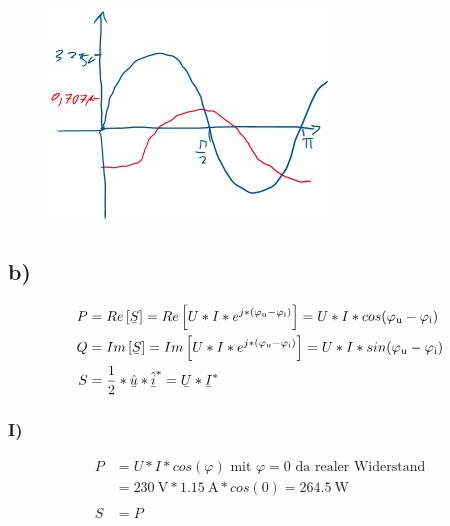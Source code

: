 \documentclass[../../document.tex]{subfiles}
\begin{document}
\begin{figure}[H]
    \begin{center}
        \includegraphics[width=.9\linewidth]{../../img/task1-a-iii.jpeg}
    \end{center}
\end{figure}

\subsection*{b)}

\begin{equation*}
    \begin{split}
        P &= Re\left[\ubar{S}\right] = Re\left[U * I * e^{j * (\varphi\cind{u} - \varphi\cind{i})}\right] = U * I * cos(\varphi\cind{u} - \varphi\cind{i})\\
        Q &= Im\left[\ubar{S}\right] = Im\left[U * I * e^{j * (\varphi\cind{u} - \varphi\cind{i})}\right] = U * I * sin(\varphi\cind{u} - \varphi\cind{i})\\
        S &= \frac{1}{2} * \ubar{\hat{u}} * \ubar{\hat{i}}^* = \ubar{U} * \ubar{I}^*
    \end{split}
\end{equation*}

\subsubsection*{I)}

\begin{equation*}
    \begin{split}
        P &= U * I * cos(\varphi) \textrm{ mit } \varphi = 0\textrm{ da realer Widerstand}\\
        &= \SI{230}{\volt} * \SI{1,15}{\ampere} * cos(0) = \SI{264,5}{\watt}\\\\
        S &= P\\
    \end{split}
\end{equation*}
\end{document}
